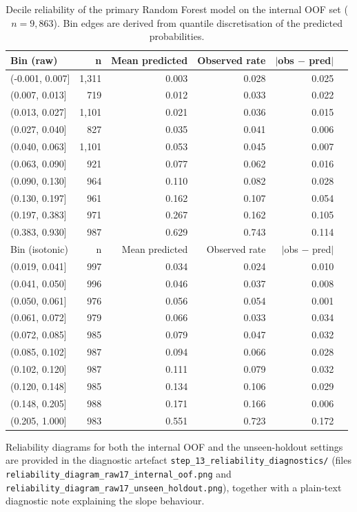 \documentclass[11pt,a4paper]{article}
\begin{document}
\begin{table}[h!]
\centering
\small
\caption{Decile reliability of the primary Random Forest model on the internal OOF set ($n=9{,}863$). Bin edges are derived from quantile discretisation of the predicted probabilities.}
\label{tab:reliability-oof}
\begin{tabular}{lrrrrr}
\toprule
Bin (raw) & n & Mean predicted & Observed rate & $|$obs $-$ pred$|$ \\
\midrule
(-0.001, 0.007] & 1{,}311 & 0.003 & 0.028 & 0.025 \\
(0.007, 0.013] & 719 & 0.012 & 0.033 & 0.022 \\
(0.013, 0.027] & 1{,}101 & 0.021 & 0.036 & 0.015 \\
(0.027, 0.040] & 827 & 0.035 & 0.041 & 0.006 \\
(0.040, 0.063] & 1{,}101 & 0.053 & 0.045 & 0.007 \\
(0.063, 0.090] & 921 & 0.077 & 0.062 & 0.016 \\
(0.090, 0.130] & 964 & 0.110 & 0.082 & 0.028 \\
(0.130, 0.197] & 961 & 0.162 & 0.107 & 0.054 \\
(0.197, 0.383] & 971 & 0.267 & 0.162 & 0.105 \\
(0.383, 0.930] & 987 & 0.629 & 0.743 & 0.114 \\
\midrule
Bin (isotonic) & n & Mean predicted & Observed rate & $|$obs $-$ pred$|$ \\
\midrule
(0.019, 0.041] & 997 & 0.034 & 0.024 & 0.010 \\
(0.041, 0.050] & 996 & 0.046 & 0.037 & 0.008 \\
(0.050, 0.061] & 976 & 0.056 & 0.054 & 0.001 \\
(0.061, 0.072] & 979 & 0.066 & 0.033 & 0.034 \\
(0.072, 0.085] & 985 & 0.079 & 0.047 & 0.032 \\
(0.085, 0.102] & 987 & 0.094 & 0.066 & 0.028 \\
(0.102, 0.120] & 987 & 0.111 & 0.079 & 0.032 \\
(0.120, 0.148] & 985 & 0.134 & 0.106 & 0.029 \\
(0.148, 0.205] & 988 & 0.171 & 0.166 & 0.006 \\
(0.205, 1.000] & 983 & 0.551 & 0.723 & 0.172 \\
\bottomrule
\end{tabular}
\end{table}

Reliability diagrams for both the internal OOF and the unseen-holdout settings are provided in the diagnostic artefact \texttt{step\_13\_reliability\_diagnostics/} (files \texttt{reliability\_diagram\_raw17\_internal\_oof.png} and \texttt{reliability\_diagram\_raw17\_unseen\_holdout.png}), together with a plain-text diagnostic note explaining the slope behaviour.
\end{document}
